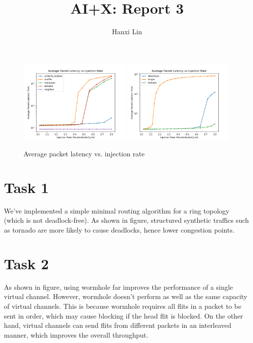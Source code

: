 \documentclass{article}
\title{\bf\huge AI+X: Report 3}
\author{Hanxi Lin}
\begin{document}
\maketitle

\begin{figure}[h]
    \centering
    \includegraphics[width=0.49\textwidth]{lab3-SYNTHETIC_TRAFFIC.png}
    \includegraphics[width=0.49\textwidth]{lab3-VC_TYPE.png}
    \caption{Average packet latency vs. injection rate}
\end{figure}

\section*{Task 1}
We've implemented a simple minimal routing algorithm for a ring topology (which is not deadlock-free). As shown in figure, structured synthetic traffics such as tornado are more likely to cause deadlocks, hence lower congestion points.

\section*{Task 2}
As shown in figure, using wormhole far improves the performance of a single virtual channel. However, wormhole doesn't perform as well as the same capacity of virtual channels. This is because wormhole requires all flits in a packet to be sent in order, which may cause blocking if the head flit is blocked. On the other hand, virtual channels can send flits from different packets in an interleaved manner, which improves the overall throughput.
\end{document}
